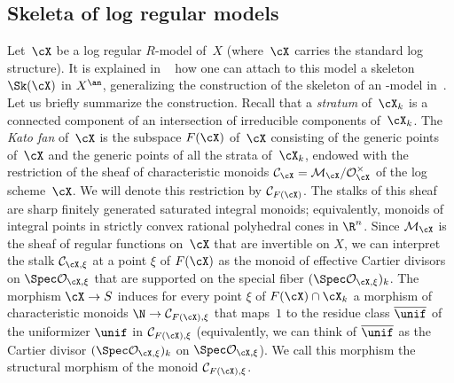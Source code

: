 \subsection{Skeleta of log regular models}\label{ss:logskeleta}
Let~$\cX$ be a log regular $R$\nobreakdash-model of~$X$ (where~$\cX$ carries the standard log structure). It is explained in ~\cite[\S3]{BrMa} how one can attach to this model a skeleton $\Sk(\cX)$ in $X^{\an}$, generalizing the construction of the skeleton of an \snc-model in~\cite[\S3]{MuNi}. Let us briefly summarize the construction.
Recall that a {\em stratum} of~$\cX_k$ is a connected component of an intersection of irreducible components of~$\cX_k$.
The {\em Kato fan} of~$\cX$
is the subspace $F(\cX)$ of~$\cX$ consisting of the generic points of~$\cX$ and the generic points of all the strata of~$\cX_k$, endowed with the restriction of the sheaf of characteristic monoids $\mathcal{C}_{\cX}=\mathcal{M}_{\cX}/\mathcal{O}^{\times}_{\cX}$ of the log scheme~$\cX$. We will denote this restriction by $\mathcal{C}_{F(\cX)}$. The stalks of this sheaf are
sharp finitely generated saturated integral monoids; equivalently, monoids of integral points in strictly convex rational polyhedral cones in $\R^n$.
Since $\mathcal{M}_{\cX}$ is the sheaf of regular functions on~$\cX$ that are invertible on $X$,
we can interpret the stalk $\mathcal{C}_{\cX,\xi}$ at a point $\xi$ of $F(\cX)$ as the monoid of effective Cartier divisors on $\Spec \mathcal{O}_{\cX,\xi}$ that are supported on the special fiber $(\Spec \mathcal{O}_{\cX,\xi})_k$.
The morphism $\cX\to S$ induces for every point $\xi$ of $F(\cX)\cap \cX_k$ a morphism of characteristic monoids $\N\to \mathcal{C}_{F(\cX),\xi}$ that maps~$1$ to the residue class $\overline{\unif}$ of the uniformizer $\unif$ in $\mathcal{C}_{F(\cX),\xi}$ (equivalently, we can think of $\overline{\unif}$ as the Cartier divisor $(\Spec \mathcal{O}_{\cX,\xi})_k$ on $\Spec \mathcal{O}_{\cX,\xi}$). We call this morphism the structural morphism of the monoid $\mathcal{C}_{F(\cX),\xi}$.

